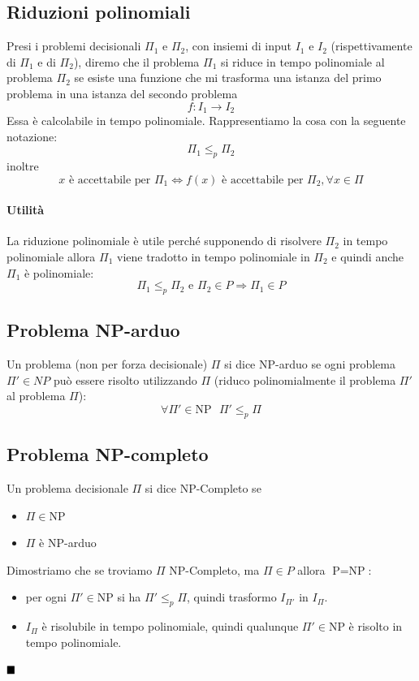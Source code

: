 \subsection{Riduzioni polinomiali}
Presi i problemi decisionali $\Pi_{1}$ e $\Pi_{2}$, con insiemi di input $I_{1}$ e $I_{2}$ (rispettivamente di $\Pi_{1}$ e di $\Pi_{2}$), diremo che il problema $\Pi_{1}$ si riduce in tempo polinomiale al problema $\Pi_{2}$ se esiste una funzione che mi trasforma una istanza del primo problema in una istanza del secondo problema $$f:I_{1} \to I_{2}$$
Essa è calcolabile in tempo polinomiale. Rappresentiamo la cosa con la seguente notazione:
$$ \Pi_{1} \leq_{p} \Pi_{2} $$
inoltre $$\boxed{x \text{ è accettabile per } \Pi_{1} \Longleftrightarrow f(x) \text{ è accettabile per } \Pi_{2}, \forall x \in \Pi}$$

\paragraph{Utilità} La riduzione polinomiale è utile perché supponendo di risolvere $\Pi_{2}$ in tempo polinomiale allora $\Pi_{1}$ viene tradotto in tempo polinomiale in $\Pi_{2}$ e quindi anche $\Pi_{1}$ è polinomiale:
$$ \Pi_{1} \leq_{p} \Pi_{2} \text{ e } \Pi_{2} \in P \Longrightarrow \Pi_{1} \in P $$
\subsection{Problema NP-arduo}
Un problema (non per forza decisionale) $\Pi$ si dice NP-arduo se ogni problema $\Pi' \in NP$ può essere risolto utilizzando $\Pi$ (riduco polinomialmente il problema $\Pi'$ al problema $\Pi$):
$$ \forall \Pi' \in \text{NP} \text{  } \Pi' \leq_{p} \Pi $$

\subsection{Problema NP-completo}
Un problema decisionale $\Pi$ si dice NP-Completo se
\begin{itemize}
	\item $\Pi \in \text{NP}$
	\item $\Pi$ è NP-arduo
\end{itemize} 
 Dimostriamo che se troviamo $\Pi$ NP-Completo, ma $\Pi \in P$ allora $\text{P}=\text{NP}$:
 \begin{itemize}
 	\item per ogni $\Pi' \in \text{NP}$ si ha $\Pi' \leq_p \Pi$, quindi trasformo $I_{\Pi'}$ in $I_{\Pi}$.
 	\item $I_{\Pi}$ è risolubile in tempo polinomiale, quindi qualunque $\Pi' \in \text{NP}$ è risolto in tempo polinomiale.
 \end{itemize}
$\hfill\blacksquare$

